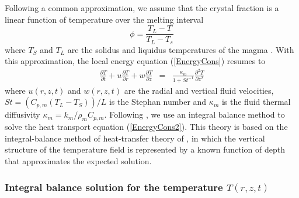 Following a common approximation, we  assume that the crystal fraction
is a linear function of temperature over the melting interval
\begin{equation}
  \phi = \frac{T_L-T}{T_L-T_s}
  \label{meltfraction}
\end{equation}
where $T_S$ and $T_L$ are the solidus and liquidus temperatures of the
magma  \citep{Hort:1997hk,Michaut:2006di}.  With  this approximation,
the local energy equation (\ref{EnergyCons}) resumes to
\begin{eqnarray}
  \frac{\partial T}{\partial t}+ u\frac{\partial T}{\partial r}
  + w\frac{\partial T}{\partial z}  &=& \frac{ \kappa_m}{1+St^{-1}}  \frac{\partial^2
                                        T}{\partial               z^2}
                                        \label{EnergyCons2}
\end{eqnarray}
where  $u(r,z,t)$ and  $w(r,z,t)$ are  the radial  and vertical  fluid
velocities,  $St  =\left(C_{p,m}(T_L-T_S)\right)/L$   is  the  Stephan
number   and    $\kappa_m$   is   the   fluid    thermal   diffusivity
$\kappa_m = k_m/\rho_m  C_{p,m}$.  Following \citet{BALMFORTH:2004fm},
we use an integral balance method to solve the heat transport equation
(\ref{EnergyCons2}).   This theory  is based  on the  integral-balance
method of heat-transfer theory of \citet{Goodman:1958ue}, in which the
vertical structure of the temperature  field is represented by a known
function of depth that approximates the expected solution.

\subsubsection{Integral   balance   solution   for   the   temperature
  $T(r,z,t)$}

